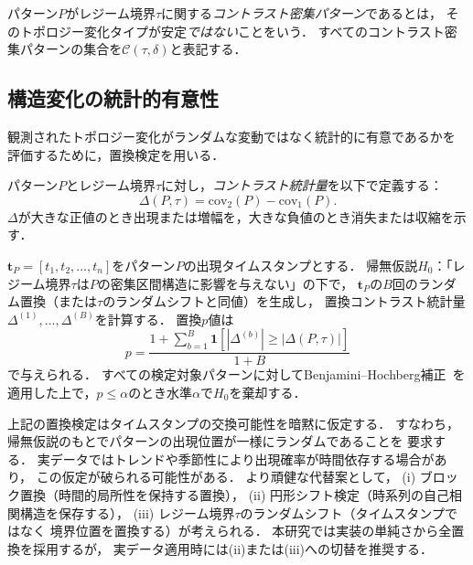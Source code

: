 \begin{definition}[コントラスト密集パターン]\label{def:cdp}
パターン$P$がレジーム境界$\tau$に関する\emph{コントラスト密集パターン}であるとは，
そのトポロジー変化タイプが安定\emph{ではない}ことをいう．
すべてのコントラスト密集パターンの集合を$\mathcal{C}(\tau, \delta)$と表記する．
\end{definition}

\subsection{構造変化の統計的有意性}

観測されたトポロジー変化がランダムな変動ではなく統計的に有意であるかを
評価するために，置換検定を用いる．

\begin{definition}[コントラスト統計量]\label{def:contrast_stat}
パターン$P$とレジーム境界$\tau$に対し，\emph{コントラスト統計量}を以下で定義する：
\begin{equation}
\Delta(P, \tau) = \text{cov}_2(P) - \text{cov}_1(P).
\label{eq:contrast_stat}
\end{equation}
$\Delta$が大きな正値のとき出現または増幅を，大きな負値のとき消失または収縮を示す．
\end{definition}

\begin{definition}[構造変化の置換検定]\label{def:permtest}
$\mathbf{t}_P = [t_1, t_2, \ldots, t_n]$をパターン$P$の出現タイムスタンプとする．
帰無仮説$H_0$：「レジーム境界$\tau$は$P$の密集区間構造に影響を与えない」の下で，
$\mathbf{t}_P$の$B$回のランダム置換（または$\tau$のランダムシフトと同値）を生成し，
置換コントラスト統計量$\Delta^{(1)}, \ldots, \Delta^{(B)}$を計算する．
置換$p$値は
\begin{equation}
p = \frac{1 + \sum_{b=1}^{B} \mathbf{1}[|\Delta^{(b)}| \geq |\Delta(P, \tau)|]}{1 + B}
\label{eq:perm_pvalue}
\end{equation}
で与えられる．
すべての検定対象パターンに対してBenjamini--Hochberg補正~\cite{benjamini1995fdr}を
適用した上で，$p \leq \alpha$のとき水準$\alpha$で$H_0$を棄却する．
\end{definition}

\begin{remark}[交換可能性の仮定]\label{rem:exchangeability}
上記の置換検定はタイムスタンプの交換可能性を暗黙に仮定する．
すなわち，帰無仮説のもとでパターンの出現位置が一様にランダムであることを
要求する．
実データではトレンドや季節性により出現確率が時間依存する場合があり，
この仮定が破られる可能性がある．
より頑健な代替案として，
(i) ブロック置換（時間的局所性を保持する置換），
(ii) 円形シフト検定（時系列の自己相関構造を保存する），
(iii) レジーム境界$\tau$のランダムシフト（タイムスタンプではなく
境界位置を置換する）が考えられる．
本研究では実装の単純さから全置換を採用するが，
実データ適用時には(ii)または(iii)への切替を推奨する．
\end{remark}

